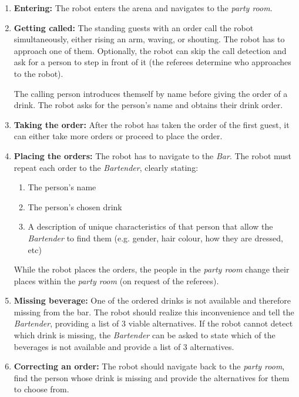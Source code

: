 \begin{enumerate}

	\item \textbf{Entering:} The robot enters the arena and navigates to the \textit{party room}.
	\item \textbf{Getting called:} The standing guests with an order call the robot simultaneously, either rising an arm, waving, or shouting. The robot has to approach one of them.
        Optionally, the robot can skip the call detection and ask for a person to step in front of it (the referees determine who approaches to the robot).

	The calling person introduces themself by name before giving the order of a drink.
	The robot asks for the person's name and obtains their drink order. \\


	\item \textbf{Taking the order:} After the robot has taken the order of the first guest, it can either take more orders or proceed to place the order.

	\item \textbf{Placing the orders:} The robot has to navigate to the \textit{Bar}. The robot must repeat each order to the \textit{Bartender}, clearly stating:
	\begin{enumerate}
		\item The person's name
		\item The person's chosen drink
		\item A description of unique characteristics of that person that allow the \textit{Bartender} to find them (e.g. gender, hair colour, how they are dressed, etc)
	\end{enumerate}

	While the robot places the orders, the people in the \textit{party room} change their places within the \textit{party room} (on request of the referees).

	  \item \textbf{Missing beverage:} One of the ordered drinks is not available and therefore missing from the bar.
	The robot should realize this inconvenience and tell the \textit{Bartender}, providing a list of 3 viable alternatives.
	If the robot cannot detect which drink is missing, the \textit{Bartender} can be asked to state which of the beverages is not available and provide a list of 3 alternatives.

	\item \textbf{Correcting an order:} The robot should navigate back to the \textit{party room}, find the person whose drink is missing and provide the alternatives for them to choose from.\\


\end{enumerate}
